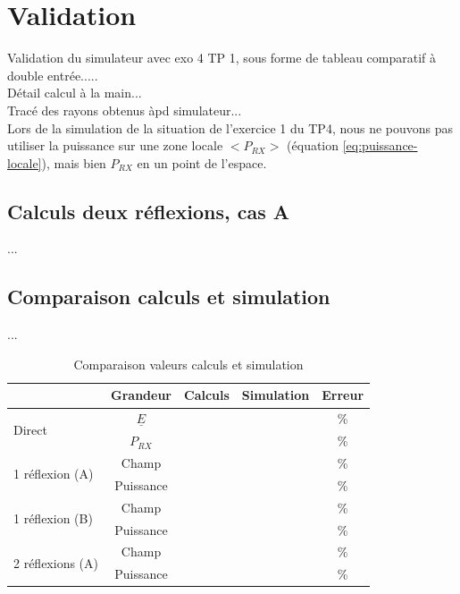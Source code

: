 \chapter{Validation}
\label{chaper-3}

Validation du simulateur avec exo 4 TP 1, sous forme de tableau comparatif à double entrée.....\\
Détail calcul à la main...\\
Tracé des rayons obtenus àpd simulateur...\\





Lors de la simulation de la situation de l'exercice 1 du TP4, nous ne pouvons pas utiliser la puissance sur une zone locale $<P_{RX}>$ (équation \ref{eq:puissance-locale}), mais bien $P_{RX}$ en un point de l'espace.

\section{Calculs deux réflexions, cas A}
...


\section{Comparaison calculs et simulation}
...


\begin{table}
    \centering
    \begin{tabular}{|l|c|c|c|c|}
         \hline
                                  & Grandeur & Calculs & Simulation & Erreur \\
        \hline
\multirow{2}{*}{Direct}           & $\underline{E}$ &         &      & \%     \\
                                  & $P_{RX}$        &         &      & \%     \\
        \hline
\multirow{2}{*}{1 réflexion (A)}  & Champ     &         &      & \%     \\
                                  & Puissance &         &      & \%     \\
        \hline
\multirow{2}{*}{1 réflexion (B)}  & Champ     &         &      & \%     \\
                                  & Puissance &         &      & \%     \\
        \hline
\multirow{2}{*}{2 réflexions (A)} & Champ     &         &      & \%     \\
                                  & Puissance &         &      & \%     \\
        \hline
    \end{tabular}
    \caption{Comparaison valeurs calculs et simulation}
    \label{tab:comparaison-calculs-simulation}
\end{table}

